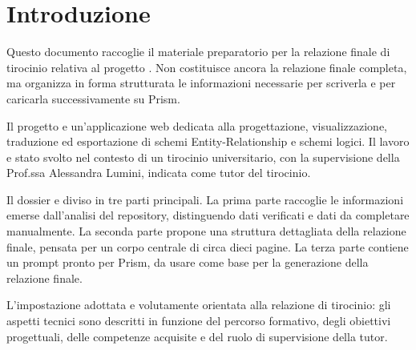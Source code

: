 
\chapter*{Introduzione}\label{ch:introduzione}

Questo documento raccoglie il materiale preparatorio per la relazione finale di tirocinio relativa al progetto \builder. Non costituisce ancora la relazione finale completa, ma organizza in forma strutturata le informazioni necessarie per scriverla e per caricarla successivamente su Prism.

Il progetto \builder{} e un'applicazione web dedicata alla progettazione, visualizzazione, traduzione ed esportazione di schemi Entity-Relationship e schemi logici. Il lavoro e stato svolto nel contesto di un tirocinio universitario, con la supervisione della Prof.ssa Alessandra Lumini, indicata come tutor del tirocinio.

Il dossier e diviso in tre parti principali. La prima parte raccoglie le informazioni emerse dall'analisi del repository, distinguendo dati verificati e dati da completare manualmente. La seconda parte propone una struttura dettagliata della relazione finale, pensata per un corpo centrale di circa dieci pagine. La terza parte contiene un prompt pronto per Prism, da usare come base per la generazione della relazione finale.

L'impostazione adottata e volutamente orientata alla relazione di tirocinio: gli aspetti tecnici sono descritti in funzione del percorso formativo, degli obiettivi progettuali, delle competenze acquisite e del ruolo di supervisione della tutor.
